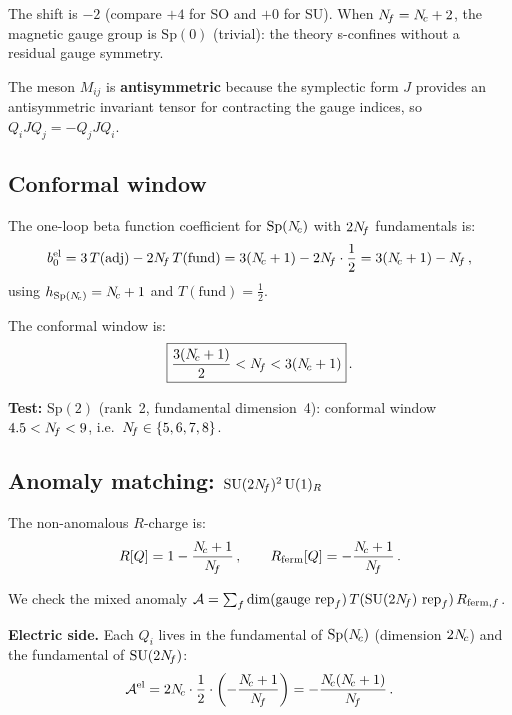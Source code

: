 \documentclass[11pt,a4paper]{article}
\newcommand{\Sp}[1]{\mathrm{Sp}(#1)}
\begin{document}
The shift is $-2$ (compare $+4$ for SO and $+0$ for SU).
When $N_{\!f} = N_{\!c} + 2$, the magnetic gauge group is $\Sp{0}$
(trivial): the theory s-confines without a residual gauge symmetry.

The meson $M_{ij}$ is \textbf{antisymmetric} because the symplectic
form $J$ provides an antisymmetric invariant tensor for contracting
the gauge indices, so $Q_i J Q_j = -Q_j J Q_i$.

\subsection{Conformal window}

The one-loop beta function coefficient for $\Sp{\Nc}$ with $2N_{\!f}$
fundamentals is:
\begin{equation}\label{eq:Sp-beta}
  b_0^{\text{el}} = 3\,T(\mathrm{adj}) - 2N_{\!f}\, T(\text{fund})
  = 3(N_{\!c} + 1) - 2N_{\!f} \cdot \frac{1}{2}
  = 3(N_{\!c} + 1) - N_{\!f}\,,
\end{equation}
using $h_{\Sp{\Nc}} = \Nc + 1$ and $T(\text{fund}) = \tfrac{1}{2}$.

The conformal window is:
\begin{equation}\label{eq:Sp-window}
  \boxed{\frac{3(N_{\!c} + 1)}{2} < N_{\!f} < 3(N_{\!c} + 1)}\,.
\end{equation}

\textbf{Test:} $\Sp{2}$ (rank~2, fundamental dimension~4):
conformal window $4.5 < N_{\!f} < 9$, i.e.\ $N_{\!f} \in \{5,6,7,8\}$.
\checkmark

\subsection{Anomaly matching: $\mathrm{SU}(2N_{\!f})^2\,\mathrm{U}(1)_R$}
\label{ssec:Sp-anomaly}

The non-anomalous $R$-charge is:
\begin{equation}\label{eq:Sp-Rcharge}
  R[Q] = 1 - \frac{N_{\!c} + 1}{N_{\!f}}\,,
  \qquad
  R_{\text{ferm}}[Q] = -\frac{N_{\!c} + 1}{N_{\!f}}\,.
\end{equation}

We check the mixed anomaly
$\mathcal{A} = \sum_f \dim(\text{gauge rep}_f)\, T(\text{SU}(2N_{\!f})
\text{ rep}_f)\, R_{\text{ferm},f}$.

\textbf{Electric side.}
Each $Q_i$ lives in the fundamental of $\Sp{\Nc}$ (dimension $2N_{\!c}$)
and the fundamental of $\mathrm{SU}(2N_{\!f})$:
\begin{equation}\label{eq:Sp-Ael}
  \mathcal{A}^{\text{el}}
  = 2N_{\!c} \cdot \frac{1}{2} \cdot \left(-\frac{N_{\!c} + 1}{N_{\!f}}\right)
  = -\frac{N_{\!c}(N_{\!c} + 1)}{N_{\!f}}\,.
\end{equation}
\end{document}
